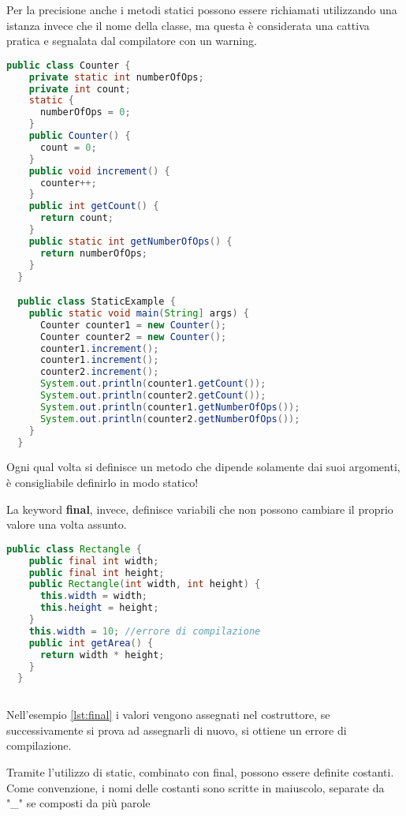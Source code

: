\documentclass[a4paper,12pt,twoside]{book}
\begin{document}
Per la precisione anche i metodi statici possono essere richiamati
utilizzando una istanza invece che il nome della classe, ma questa è
considerata una cattiva pratica e segnalata dal compilatore con un
warning.

\begin{lstlisting}[caption={}, label={lst:static}, language=Java]
  public class Counter {
    private static int numberOfOps;
    private int count;
    static {
      numberOfOps = 0;
    }
    public Counter() {
      count = 0;
    }
    public void increment() {
      counter++;
    }
    public int getCount() {
      return count;
    }
    public static int getNumberOfOps() {
      return numberOfOps;
    }
  }

  public class StaticExample {
    public static void main(String] args) {
      Counter counter1 = new Counter();
      Counter counter2 = new Counter();
      counter1.increment();
      counter1.increment();
      counter2.increment();
      System.out.println(counter1.getCount());
      System.out.println(counter2.getCount());
      System.out.println(counter1.getNumberOfOps());
      System.out.println(counter2.getNumberOfOps());
    }
  }
\end{lstlisting}

Ogni qual volta si definisce un metodo che dipende solamente dai suoi
argomenti, è consigliabile definirlo in modo statico!

La keyword \textbf{final}, invece, definisce variabili che non possono cambiare
il proprio valore una volta assunto.

\begin{lstlisting}[caption={}, label={lst:final}, language=Java]
  public class Rectangle {
    public final int width;
    public final int height;
    public Rectangle(int width, int height) {
      this.width = width;
      this.height = height;
    }
    this.width = 10; //errore di compilazione
    public int getArea() {
      return width * height;
    }
  }
  
\end{lstlisting}

Nell'esempio \ref{lst:final} i valori vengono assegnati nel
costruttore, se successivamente si prova ad assegnarli di nuovo, si
ottiene un errore di compilazione.

Tramite l’utilizzo di static, combinato con final, possono essere
definite costanti.  Come convenzione, i nomi delle costanti sono
scritte in maiuscolo, separate da "\_" se composti da più parole
\end{document}
